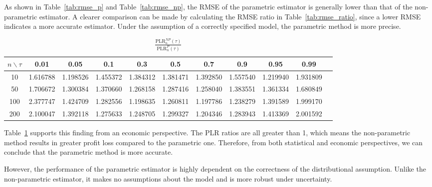 As shown in Table~\ref{tab:rmse_p}
and Table~\ref{tab:rmse_np}, the RMSE of the parametric estimator is generally lower than that of the non-parametric estimator. A clearer comparison can be made by calculating the RMSE ratio in Table~\ref{tab:rmse_ratio}, since a lower RMSE indicates a more accurate estimator. Under the assumption of a correctly specified model, the parametric method is more precise.

\begin{table}[H]
\centering
\caption{ $\frac{\text{PLR}^{NP}_n(\tau)}{\text{PLR}^{P}_n(\tau)}$ }
\label{tab:plr_ratio}
\renewcommand{\arraystretch}{1.2}
\begin{tabular}{|c|c|c|c|c|c|c|c|c|c|c|}
\hline
$n \backslash \tau$ & 0.01 & 0.05 & 0.1 & 0.3 & 0.5 & 0.7 & 0.9 & 0.95 & 0.99 \\
\hline
10  & 1.616788 & 1.198526 & 1.455372 & 1.384312 & 1.381471 & 1.392850 & 1.557540 & 1.219940 & 1.931809 \\
50  & 1.706672 & 1.300384 & 1.370660 & 1.268158 & 1.287416 & 1.258040 & 1.383551 & 1.361334 & 1.680849 \\
100 & 2.377747 & 1.424709 & 1.282556 & 1.198635 & 1.260811 & 1.197786 & 1.238279 & 1.391589 & 1.999170 \\
200 & 2.100047 & 1.392118 & 1.275633 & 1.248705 & 1.299327 & 1.204346 & 1.283943 & 1.413369 & 2.001592 \\
\hline
\end{tabular}
\end{table}


Table~\ref{tab:plr_ratio} supports this finding from an economic perspective. The PLR ratios are all greater than 1, which means the non-parametric method results in greater profit loss compared to the parametric one. Therefore, from both statistical and economic perspectives, we can conclude that the parametric method is more accurate.

However, the performance of the parametric estimator is highly dependent on the correctness of the distributional assumption. Unlike the non-parametric estimator, it makes no assumptions about the model and is more robust under uncertainty.

